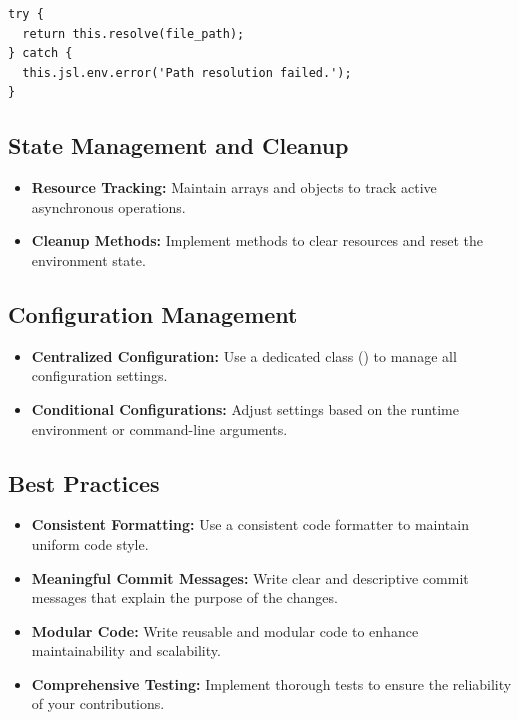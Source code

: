 \documentclass[12pt,a4paper]{article}
\begin{document}
\begin{lstlisting}[style=JavaScriptStyle]
try {
  return this.resolve(file_path);
} catch {
  this.jsl.env.error('Path resolution failed.');
}
\end{lstlisting}

\subsection{State Management and Cleanup}
\begin{itemize}
  \item \textbf{Resource Tracking:} Maintain arrays and objects to track active asynchronous operations.

  \item \textbf{Cleanup Methods:} Implement methods to clear resources and reset the environment state.
\end{itemize}

\subsection{Configuration Management}
\begin{itemize}
  \item \textbf{Centralized Configuration:} Use a dedicated class () to manage all configuration settings.

  \item \textbf{Conditional Configurations:} Adjust settings based on the runtime environment or command-line arguments.
\end{itemize}

\subsection{Best Practices}
\begin{itemize}
  \item \textbf{Consistent Formatting:} Use a consistent code formatter to maintain uniform code style.

  \item \textbf{Meaningful Commit Messages:} Write clear and descriptive commit messages that explain the purpose of the changes.

  \item \textbf{Modular Code:} Write reusable and modular code to enhance maintainability and scalability.

  \item \textbf{Comprehensive Testing:} Implement thorough tests to ensure the reliability of your contributions.
\end{itemize}
\end{document}
